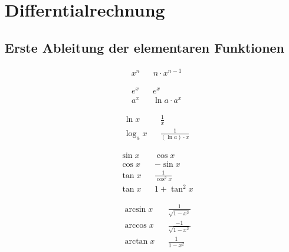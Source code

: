 \section{Differntialrechnung}

\subsection{Erste Ableitung der elementaren Funktionen}
\begin{boxleft}
\end{boxleft}\begin{boxrightshaded}
 \begin{align}
  &x^n& 	&n\cdot x^{n-1}
 \end{align}
\end{boxrightshaded}

\begin{boxleft}
\end{boxleft}\begin{boxrightshaded} \begin{align}
  &e^x& 	&e^x\\
  &a^x& 	&\ln a\cdot a^x
 \end{align}
\end{boxrightshaded}

\begin{boxleft}
\end{boxleft}\begin{boxrightshaded}
 \begin{align} 
  &\ln x& &\frac{1}{x}\\
  &\log_a x&	&\frac{1}{(\ln a)\cdot x}
 \end{align}
\end{boxrightshaded}

\begin{boxleft}
\end{boxleft}\begin{boxrightshaded}
 \begin{align} 
  &\sin x& 	&\cos x \\
  &\cos x& 	&-\sin x\\
  &\tan x&	&\frac{1}{\cos^2 x}\\
  &\tan x&	&1+\tan^2 x
\end{align}\end{boxrightshaded}
 
\begin{boxleft}
\end{boxleft}\begin{boxrightshaded}
 \begin{align} 
  &\arcsin x& &\frac{1}{\sqrt{1-x^2}}\\
  &\arccos x& &\frac{-1}{\sqrt{1-x^2}}\\
  &\arctan x& &\frac{1}{1-x^2}
\end{align}\end{boxrightshaded}

